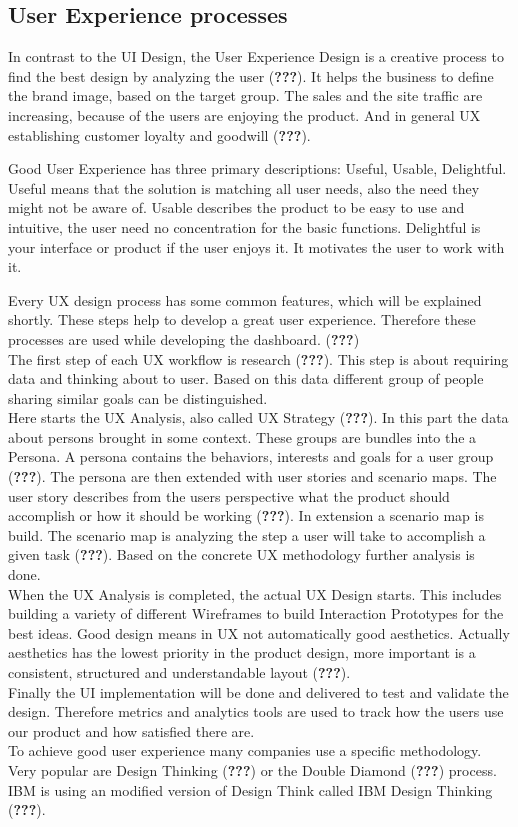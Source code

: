 \documentclass[american,a4paper,oneside,,tablecaptionabove]{scrbook}
\begin{document}
\subsection{User Experience processes}\label{user-experience-processes}

In contrast to the UI Design, the User Experience Design is a creative
process to find the best design by analyzing the user ({\textbf{???}}).
It helps the business to define the brand image, based on the target
group. The sales and the site traffic are increasing, because of the
users are enjoying the product. And in general UX establishing customer
loyalty and goodwill ({\textbf{???}}).

Good User Experience has three primary descriptions: Useful, Usable,
Delightful. Useful means that the solution is matching all user needs,
also the need they might not be aware of. Usable describes the product
to be easy to use and intuitive, the user need no concentration for the
basic functions. Delightful is your interface or product if the user
enjoys it. It motivates the user to work with it.

Every UX design process has some common features, which will be
explained shortly. These steps help to develop a great user experience.
Therefore these processes are used while developing the dashboard.
({\textbf{???}})\\
The first step of each UX workflow is research ({\textbf{???}}). This
step is about requiring data and thinking about to user. Based on this
data different group of people sharing similar goals can be
distinguished.\\
Here starts the UX Analysis, also called UX Strategy ({\textbf{???}}).
In this part the data about persons brought in some context. These
groups are bundles into the a Persona. A persona contains the behaviors,
interests and goals for a user group ({\textbf{???}}). The persona are
then extended with user stories and scenario maps. The user story
describes from the users perspective what the product should accomplish
or how it should be working ({\textbf{???}}). In extension a scenario
map is build. The scenario map is analyzing the step a user will take to
accomplish a given task ({\textbf{???}}). Based on the concrete UX
methodology further analysis is done.\\
When the UX Analysis is completed, the actual UX Design starts. This
includes building a variety of different Wireframes to build Interaction
Prototypes for the best ideas. Good design means in UX not automatically
good aesthetics. Actually aesthetics has the lowest priority in the
product design, more important is a consistent, structured and
understandable layout ({\textbf{???}}).\\
Finally the UI implementation will be done and delivered to test and
validate the design. Therefore metrics and analytics tools are used to
track how the users use our product and how satisfied there are.\\
To achieve good user experience many companies use a specific
methodology. Very popular are Design Thinking ({\textbf{???}}) or the
Double Diamond ({\textbf{???}}) process. IBM is using an modified
version of Design Think called IBM Design Thinking ({\textbf{???}}).
\end{document}
